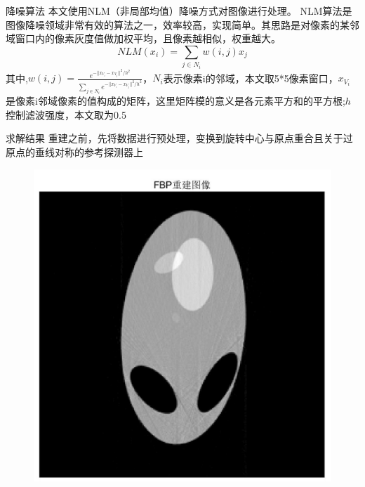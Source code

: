 \documentclass{beamer} %
\begin{document}
\begin{frame}{降噪算法}
	本文使用NLM（非局部均值）降噪方式对图像进行处理。 NLM算法是图像降噪领域非常有效的算法之一，效率较高，实现简单。其思路是对像素的某邻域窗口内的像素灰度值做加权平均，且像素越相似，权重越大。
	\begin{equation}
		NLM(x_{i})=\sum_{j\in N_{i}} w(i,j)x_{j}
	\end{equation}
	其中,\(w(i,j)=\frac{e^{-||x_{V_{i}}-x_{V_{j}}||^2/h^2}}{\sum_{j\in N_{i}}e^{-||x_{V_{i}}-x_{V_{j}}||^2/h^2}}\)，$N_{i}$表示像素i的邻域，本文取5*5像素窗口，$x_{V_{i}}$是像素i邻域像素的值构成的矩阵，这里矩阵模的意义是各元素平方和的平方根;$h$控制滤波强度，本文取为0.5
\end{frame}
  

\begin{frame}{求解结果}
	重建之前，先将数据进行预处理，变换到旋转中心与原点重合且关于过原点的垂线对称的参考探测器上\\
	\begin{figure}[H]
		\begin{minipage}[H]{0.4\textwidth}
		\centering
		\includegraphics[width=\textwidth]{./pic/P2_FBP.jpg}
		\end{minipage}
		\begin{minipage}[H]{0.4\textwidth}
		\centering

\end{minipage}
\end{figure}
\end{frame}
\end{document}
